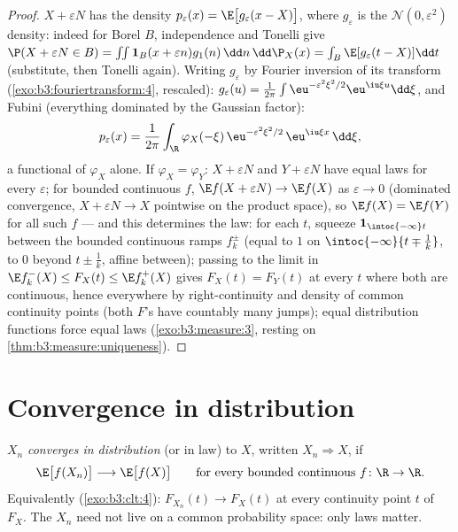 \begin{proof}
$X + \varepsilon N$ has the density $p_\varepsilon(x) =
\E\bigl[g_\varepsilon(x - X)\bigr]$, where $g_\varepsilon$ is
the $\mathcal N(0, \varepsilon^2)$ density: indeed for Borel
$B$, independence and Tonelli give $\P(X + \varepsilon N \in
B) = \int\!\!\int\mathbf 1_B(x + \varepsilon
n)g_1(n)\,\dd n\,\dd\P_X(x) = \int_B\E[g_\varepsilon(t -
X)]\dd t$ (substitute, then Tonelli again). Writing
$g_\varepsilon$ by Fourier inversion of its transform
(\cref{exo:b3:fouriertransform:4}, rescaled):
$g_\varepsilon(u) = \frac1{2\pi}\int
\eu^{-\varepsilon^2\xi^2/2}\eu^{\iu\xi u}\dd\xi$, and Fubini
(everything dominated by the Gaussian factor):
\[
p_\varepsilon(x) = \frac1{2\pi}\int_\R
\varphi_X(-\xi)\,\eu^{-\varepsilon^2\xi^2/2}\,
\eu^{\iu\xi x}\,\dd\xi ,
\]
a functional of $\varphi_X$ alone. If $\varphi_X =
\varphi_Y$: $X + \varepsilon N$ and $Y + \varepsilon N$ have
equal laws for every $\varepsilon$; for bounded continuous
$f$, $\E f(X + \varepsilon N) \to \E f(X)$ as $\varepsilon
\to 0$ (dominated convergence, $X + \varepsilon N \to X$
pointwise on the product space), so $\E f(X) = \E f(Y)$ for
all such $f$ --- and this determines the law: for each $t$,
squeeze $\mathbf 1_{\intoc{-\infty}t}$ between the bounded
continuous ramps $f_k^\pm$ (equal to $1$ on
$\intoc{-\infty}{t \mp \frac1k}$, to $0$ beyond $t \pm
\frac1k$, affine between); passing to the limit in $\E
f_k^-(X) \leq F_X(t) \leq \E f_k^+(X)$ gives $F_X(t) =
F_Y(t)$ at every $t$ where both are continuous, hence
everywhere by right-continuity and density of common
continuity points (both $F$'s have countably many jumps);
equal distribution functions force equal laws
(\cref{exo:b3:measure:3}, resting on
\cref{thm:b3:measure:uniqueness}).
\end{proof}

\section{Convergence in distribution}

\begin{definition}\label{def:b3:clt:cid}
$X_n$ \emph{converges in distribution} (or in law) to $X$,
written $X_n \Rightarrow X$, if
\[
\E\bigl[f(X_n)\bigr] \longrightarrow \E\bigl[f(X)\bigr]
\qquad\text{for every bounded continuous } f\colon\R\to\R .
\]
Equivalently (\cref{exo:b3:clt:4}): $F_{X_n}(t) \to F_X(t)$
at every continuity point $t$ of $F_X$. The $X_n$ need not
live on a common probability space: only laws matter.
\end{definition}

